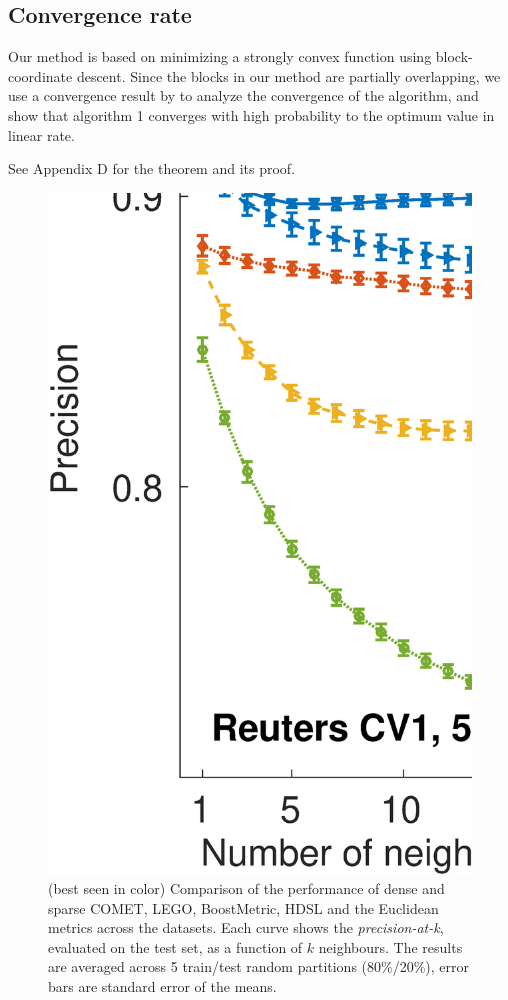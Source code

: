 \documentclass[twoside,11pt]{article}
\begin{document}
\subsection{Convergence rate}
Our method is based on minimizing a strongly convex function using block-coordinate descent. Since the blocks in our method are partially overlapping, we use a convergence result by \citet{richtarik2013optimal} to analyze the convergence of the algorithm, and show that algorithm 1 converges with high probability to the optimum value in linear rate.  

See Appendix D for the theorem and its proof.
\begin{figure}[h]
\centering
\includegraphics[width=12cm]{Precision_at_K_all_datasets}
\caption{(best seen in color) Comparison of the performance of dense and sparse COMET, LEGO, BoostMetric, HDSL and the Euclidean metrics across the datasets. Each curve shows the \textit{precision-at-k}, evaluated on the test set, as a function of $k$ neighbours. The results are averaged across 5 train/test random partitions (80\%/20\%), error bars are standard error of the means.}\label{precFig}
\end{figure}
\end{document}
